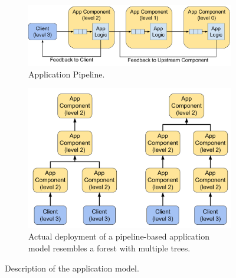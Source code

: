 \begin{figure}[ht]
\centering
\begin{subfigure}{.48\columnwidth}
  \centering
    \includegraphics[width=\columnwidth]{figures/oneedge/app_pipeline.pdf}
    \caption{Application Pipeline.}
    \label{fig:app_pipeline_oneedge}
\end{subfigure}
\begin{subfigure}{.48\columnwidth}
  \centering
    \includegraphics[width=\columnwidth]{figures/oneedge/pipeline_tree.pdf}
    \caption{Actual deployment of a pipeline-based application model resembles a forest with multiple trees.}
    \label{fig:pipeline_tree}
\end{subfigure}
\caption{Description of the application model.}
\label{fig:app_model}
\end{figure}

